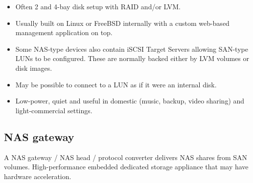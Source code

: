 \documentclass[slides]{pgnotes}
\begin{document}
\begin{itemize}
\item
  Often 2 and 4-bay disk setup with RAID and/or LVM.
\item
  Usually built on Linux or FreeBSD internally with a custom web-based
  management application on top.
\item
  Some NAS-type devices also contain iSCSI Target Servers allowing
  SAN-type LUNs to be configured. These are normally backed either by
  LVM volumes or disk images.
\item
  May be possible to connect to a LUN as if it were an internal disk.
\item
  Low-power, quiet and useful in domestic (music, backup, video sharing)
  and light-commercial settings.
\end{itemize}

\subsection{NAS gateway}
\label{sec:nas-gateway}

A NAS gateway / NAS head / protocol converter delivers NAS shares from
SAN volumes. High-performance embedded dedicated storage appliance that
may have hardware acceleration.
\end{document}
